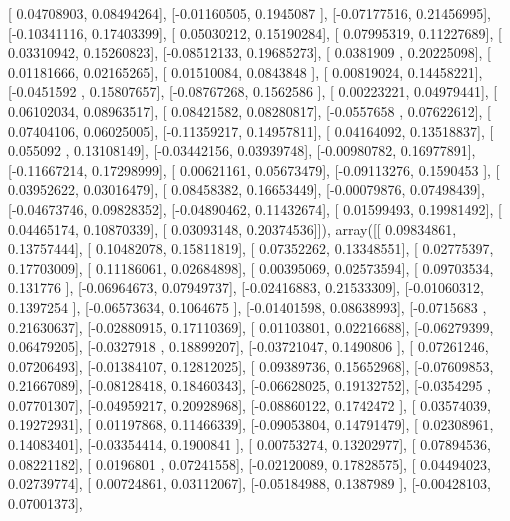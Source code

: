 \documentclass{article}
\begin{document}
       [ 0.04708903,  0.08494264],
       [-0.01160505,  0.1945087 ],
       [-0.07177516,  0.21456995],
       [-0.10341116,  0.17403399],
       [ 0.05030212,  0.15190284],
       [ 0.07995319,  0.11227689],
       [ 0.03310942,  0.15260823],
       [-0.08512133,  0.19685273],
       [ 0.0381909 ,  0.20225098],
       [ 0.01181666,  0.02165265],
       [ 0.01510084,  0.0843848 ],
       [ 0.00819024,  0.14458221],
       [-0.0451592 ,  0.15807657],
       [-0.08767268,  0.1562586 ],
       [ 0.00223221,  0.04979441],
       [ 0.06102034,  0.08963517],
       [ 0.08421582,  0.08280817],
       [-0.0557658 ,  0.07622612],
       [ 0.07404106,  0.06025005],
       [-0.11359217,  0.14957811],
       [ 0.04164092,  0.13518837],
       [ 0.055092  ,  0.13108149],
       [-0.03442156,  0.03939748],
       [-0.00980782,  0.16977891],
       [-0.11667214,  0.17298999],
       [ 0.00621161,  0.05673479],
       [-0.09113276,  0.1590453 ],
       [ 0.03952622,  0.03016479],
       [ 0.08458382,  0.16653449],
       [-0.00079876,  0.07498439],
       [-0.04673746,  0.09828352],
       [-0.04890462,  0.11432674],
       [ 0.01599493,  0.19981492],
       [ 0.04465174,  0.10870339],
       [ 0.03093148,  0.20374536]]), array([[ 0.09834861,  0.13757444],
       [ 0.10482078,  0.15811819],
       [ 0.07352262,  0.13348551],
       [ 0.02775397,  0.17703009],
       [ 0.11186061,  0.02684898],
       [ 0.00395069,  0.02573594],
       [ 0.09703534,  0.131776  ],
       [-0.06964673,  0.07949737],
       [-0.02416883,  0.21533309],
       [-0.01060312,  0.1397254 ],
       [-0.06573634,  0.1064675 ],
       [-0.01401598,  0.08638993],
       [-0.0715683 ,  0.21630637],
       [-0.02880915,  0.17110369],
       [ 0.01103801,  0.02216688],
       [-0.06279399,  0.06479205],
       [-0.0327918 ,  0.18899207],
       [-0.03721047,  0.1490806 ],
       [ 0.07261246,  0.07206493],
       [-0.01384107,  0.12812025],
       [ 0.09389736,  0.15652968],
       [-0.07609853,  0.21667089],
       [-0.08128418,  0.18460343],
       [-0.06628025,  0.19132752],
       [-0.0354295 ,  0.07701307],
       [-0.04959217,  0.20928968],
       [-0.08860122,  0.1742472 ],
       [ 0.03574039,  0.19272931],
       [ 0.01197868,  0.11466339],
       [-0.09053804,  0.14791479],
       [ 0.02308961,  0.14083401],
       [-0.03354414,  0.1900841 ],
       [ 0.00753274,  0.13202977],
       [ 0.07894536,  0.08221182],
       [ 0.0196801 ,  0.07241558],
       [-0.02120089,  0.17828575],
       [ 0.04494023,  0.02739774],
       [ 0.00724861,  0.03112067],
       [-0.05184988,  0.1387989 ],
       [-0.00428103,  0.07001373],
\end{document}
